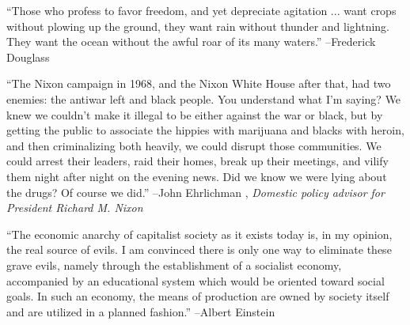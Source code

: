 \documentclass{article}%
\begin{document}
\begin{minipage}{\textwidth}%
\flushleft%
“Those who profess to favor freedom, and yet depreciate agitation ... want crops without plowing up the ground, they want rain without thunder and lightning. They want the ocean without the awful roar of its many waters.”%
\linebreak%
\vspace{1mm}%
–Frederick Douglass%
\linebreak%
\vspace{1mm}%
\end{minipage}%
\linebreak%
\vspace{1mm}%
\begin{minipage}{\textwidth}%
\flushleft%
“The Nixon campaign in 1968, and the Nixon White House after that, had two enemies: the antiwar left and black people. You understand what I'm saying? We knew we couldn't make it illegal to be either against the war or black, but by getting the public to associate the hippies with marijuana and blacks with heroin, and then criminalizing both heavily, we could disrupt those communities. We could arrest their leaders, raid their homes, break up their meetings, and vilify them night after night on the evening news. Did we know we were lying about the drugs? Of course we did.”%
\linebreak%
\vspace{1mm}%
–John Ehrlichman%
, \textit{Domestic policy advisor for President Richard M. Nixon}%
\linebreak%
\vspace{1mm}%
\end{minipage}%
\linebreak%
\vspace{1mm}%
\begin{minipage}{\textwidth}%
\flushleft%
“The economic anarchy of capitalist society as it exists today is, in my opinion, the real source of evils. I am convinced there is only one way to eliminate these grave evils, namely through the establishment of a socialist economy, accompanied by an educational system which would be oriented toward social goals. In such an economy, the means of production are owned by society itself and are utilized in a planned fashion.”%
\linebreak%
\vspace{1mm}%
–Albert Einstein%
\linebreak%
\vspace{1mm}%
\end{minipage}%
\end{document}
